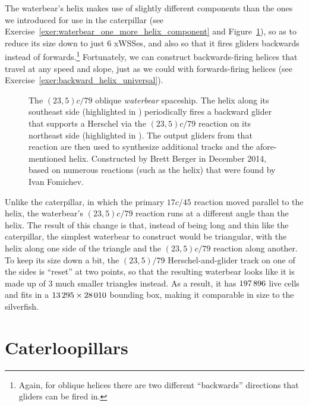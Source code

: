 The waterbear's helix makes use of slightly different components than the ones we introduced for use in the caterpillar (see Exercise~\ref{exer:waterbear_one_more_helix_component} and Figure~\ref{fig:waterbear}), so as to reduce its size down to just $6$ xWSSes, and also so that it fires gliders backwards instead of forwards.\footnote{Again, for oblique helices there are two different ``backwards'' directions that gliders can be fired in.} Fortunately, we can construct backwards-firing helices that travel at any speed and slope, just as we could with forwards-firing helices (see Exercise~\ref{exer:backward_helix_universal}).

\begin{figure}[!htbp]
	\centering
	\caption{The $(23,5)c/79$ oblique \emph{waterbear} spaceship. The helix along its southeast side (highlighted in ) periodically fires a backward glider that supports a Herschel via the $(23,5)c/79$ reaction on its northeast side (highlighted in ). The output gliders from that reaction are then used to synthesize additional tracks and the afore-mentioned helix. Constructed by Brett Berger in December 2014, based on numerous reactions (such as the helix) that were found by Ivan Fomichev.}\label{fig:waterbear}
\end{figure}

Unlike the caterpillar, in which the primary $17c/45$ reaction moved parallel to the helix, the waterbear's $(23,5)c/79$ reaction runs at a different angle than the helix. The result of this change is that, instead of being long and thin like the caterpillar, the simplest waterbear to construct would be triangular, with the helix along one side of the triangle and the $(23,5)c/79$ reaction along another. To keep its size down a bit, the $(23,5)/79$ Herschel-and-glider track on one of the sides is ``reset'' at two points, so that the resulting waterbear looks like it is made up of $3$ much smaller triangles instead. As a result, it has $197{\,}896$ live cells and fits in a $13{\,}295 \times 28{\,}010$ bounding box, making it comparable in size to the silverfish.



\section{Caterloopillars}\label{sec:caterloopillar}


